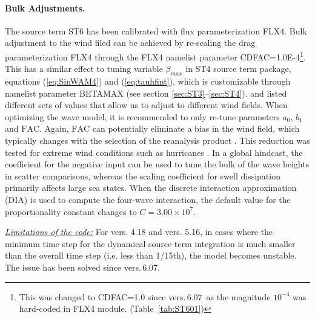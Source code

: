 \paragraph{Bulk Adjustments.} The source term
{\code ST6} has been calibrated with flux parameterization {\code FLX4}.
Bulk adjustment to the wind filed can be achieved by re-scaling the drag
parameterization {\code FLX4} through the {\F FLX4} namelist parameter {\code
 CDFAC=1.0E-4}\footnote{This was changed to {\code CDFAC=1.0} since vers.\,6.07\ as the magnitude $10^{-4}$ was hard-coded
in {\code FLX4} module. (Table~\ref{tab:ST601})}. This has a similar effect to tuning variable
$\beta_{max}$ in {\code ST4} source term package, equations
(\ref{eq:SinWAM4}) and (\ref{eq:tauhfint}), which is customizable
through namelist parameter {\code BETAMAX} (see section
\ref{sec:ST3}--\ref{sec:ST4}). \citet{pro:Aea11} and \citet{art:RA13}
listed different sets of values that allow us to adjust to different
wind fields. When optimizing the wave model, it is recommended to
only re-tune parameters $a_0$, $b_1$ and $\mathrm{FAC}$. Again, $\mathrm{FAC}$
can potentially eliminate a bias in the wind field, which typically changes
with the selection of the reanalysis product \citep[][see Table~\ref{tab:ST601}]{Liu2021}. This reduction was tested
for extreme wind conditions such as hurricanes \citep{art:ZBRY15}.  In
a global hindcast, the coefficient for the negative input can be used to tune
the bulk of the wave heights in scatter comparisons, whereas the scaling
coefficient for swell dissipation primarily affects large sea states.
When the discrete interaction approximation ({\code DIA}) is used to compute the four-wave
interaction, the default value for the proportionality constant changes to
$C=3.00\times10^7$.

\textrm{\textit{\underline{Limitations of the code:}}} For vers. 4.18 and
vers. 5.16, in cases where the minimum time step for the dynamical source term
integration is much smaller than the overall time step (i.e. less than
1/15th), the model becomes unstable. The issue has been solved since vers.\,6.07.
